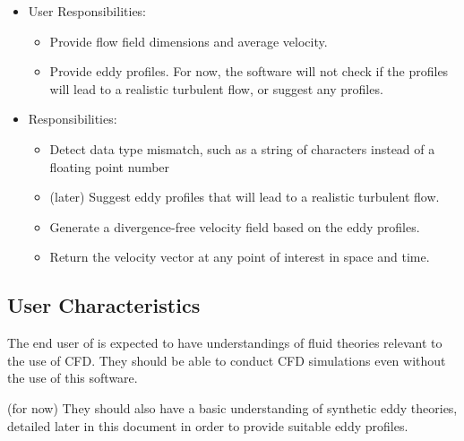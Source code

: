 \documentclass[12pt]{article}
\begin{document}
\begin{itemize}
\item User Responsibilities:
\begin{itemize}
\item Provide flow field dimensions and average velocity.
\item Provide eddy profiles. For now, the software will not check if the profiles will lead to a realistic turbulent flow, or suggest any profiles.
\end{itemize}
\item \progname{} Responsibilities:
\begin{itemize}
\item Detect data type mismatch, such as a string of characters instead of a
  floating point number
\item (later) Suggest eddy profiles that will lead to a realistic turbulent flow.
\item Generate a divergence-free velocity field based on the eddy profiles.
\item Return the velocity vector at any point of interest in space and time.
\end{itemize}
\end{itemize}


\subsection{User Characteristics} \label{SecUserCharacteristics}

The end user of \progname{} is expected to have understandings of fluid theories relevant to the use of CFD. They should be able to conduct CFD simulations even without the use of this software. 

(for now) They should also have a basic understanding of synthetic eddy theories, detailed later in this document in order to provide suitable eddy profiles.
\end{document}

